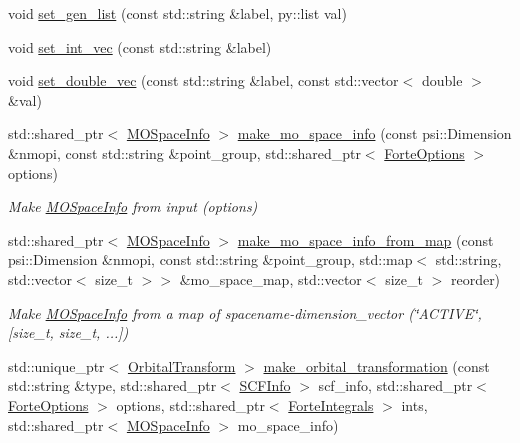 \begin{DoxyCompactItemize}
void \mbox{\hyperlink{namespaceforte_a6ab9850b9eb81ebf20b8041581f5e88f}{set\+\_\+gen\+\_\+list}} (const std\+::string \&label, py\+::list val)
\item 
void \mbox{\hyperlink{namespaceforte_acbfd686ccc14f5aef30974a61fd051a4}{set\+\_\+int\+\_\+vec}} (const std\+::string \&label)
\item 
void \mbox{\hyperlink{namespaceforte_a99500940bf19abec0b2b0d8c8a571164}{set\+\_\+double\+\_\+vec}} (const std\+::string \&label, const std\+::vector$<$ double $>$ \&val)
\item 
std\+::shared\+\_\+ptr$<$ \mbox{\hyperlink{classforte_1_1_m_o_space_info}{M\+O\+Space\+Info}} $>$ \mbox{\hyperlink{namespaceforte_aa9f89022974a234d0346f3da95429247}{make\+\_\+mo\+\_\+space\+\_\+info}} (const psi\+::\+Dimension \&nmopi, const std\+::string \&point\+\_\+group, std\+::shared\+\_\+ptr$<$ \mbox{\hyperlink{classforte_1_1_forte_options}{Forte\+Options}} $>$ options)
\begin{DoxyCompactList}\small\item\em Make \mbox{\hyperlink{classforte_1_1_m_o_space_info}{M\+O\+Space\+Info}} from input (options) \end{DoxyCompactList}\item 
std\+::shared\+\_\+ptr$<$ \mbox{\hyperlink{classforte_1_1_m_o_space_info}{M\+O\+Space\+Info}} $>$ \mbox{\hyperlink{namespaceforte_a3e043074979348f86b002b2087141750}{make\+\_\+mo\+\_\+space\+\_\+info\+\_\+from\+\_\+map}} (const psi\+::\+Dimension \&nmopi, const std\+::string \&point\+\_\+group, std\+::map$<$ std\+::string, std\+::vector$<$ size\+\_\+t $>$$>$ \&mo\+\_\+space\+\_\+map, std\+::vector$<$ size\+\_\+t $>$ reorder)
\begin{DoxyCompactList}\small\item\em Make \mbox{\hyperlink{classforte_1_1_m_o_space_info}{M\+O\+Space\+Info}} from a map of spacename-\/dimension\+\_\+vector (\char`\"{}\+A\+C\+T\+I\+V\+E\char`\"{}, \mbox{[}size\+\_\+t, size\+\_\+t, ...\mbox{]}) \end{DoxyCompactList}\item 
std\+::unique\+\_\+ptr$<$ \mbox{\hyperlink{classforte_1_1_orbital_transform}{Orbital\+Transform}} $>$ \mbox{\hyperlink{namespaceforte_ada49194260509ae60783b9a926de0867}{make\+\_\+orbital\+\_\+transformation}} (const std\+::string \&type, std\+::shared\+\_\+ptr$<$ \mbox{\hyperlink{classforte_1_1_s_c_f_info}{S\+C\+F\+Info}} $>$ scf\+\_\+info, std\+::shared\+\_\+ptr$<$ \mbox{\hyperlink{classforte_1_1_forte_options}{Forte\+Options}} $>$ options, std\+::shared\+\_\+ptr$<$ \mbox{\hyperlink{classforte_1_1_forte_integrals}{Forte\+Integrals}} $>$ ints, std\+::shared\+\_\+ptr$<$ \mbox{\hyperlink{classforte_1_1_m_o_space_info}{M\+O\+Space\+Info}} $>$ mo\+\_\+space\+\_\+info)
$$
\end{DoxyCompactItemize}
